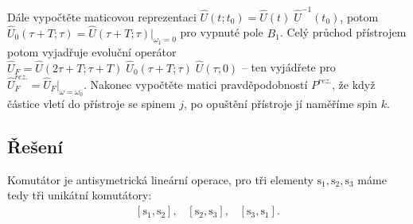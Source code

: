 \documentclass[10pt,a4paper]{article}
\newcommand{\comm}[2]{\left[ #1, #2 \right]}
\newcommand{\const}[1]{\text{#1}}
\begin{document}
\bigskip

Dále vypočtěte maticovou reprezentaci $\hat{U}(t; t_0) = \hat{U}(t) \; \hat{U}^{-1}(t_0)$, potom $\hat{U}_0(\tau + T; \tau) = \hat{U}(\tau + T; \tau)|_{\omega_1 = 0}$ pro vypnuté pole $B_1$. Celý průchod přístrojem potom vyjadřuje evoluční operátor $\hat{U}_F = \hat{U}(2\tau + T; \tau + T) \; \hat{U}_0(\tau + T; \tau) \; \hat{U}(\tau; 0)$ – ten vyjádřete pro $\hat{U}_F^\textit{rez.} = \hat{U}_F |_{\omega = \omega_0}$. Nakonec vypočtěte matici pravděpodobností $P^\textit{rez.}$, že když částice vletí do přístroje se spinem $j$, po opuštění přístroje jí naměříme spin $k$.



\subsection{Řešení}
Komutátor je antisymetrická lineární operace, pro tři elementy $\const{s}_1, \const{s}_2, \const{s}_3$ máme tedy tři unikátní komutátory:
\begin{align*}
    \comm{\const{s}_1}{\const{s}_2},
    \;\;\;
    \comm{\const{s}_2}{\const{s}_3},
    \;\;\;
    \comm{\const{s}_3}{\const{s}_1}.
\end{align*}
\end{document}

